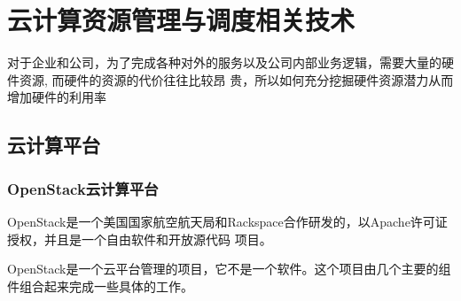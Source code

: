 
\chapter{云计算资源管理与调度相关技术}
\label{chap:outline}

对于企业和公司，为了完成各种对外的服务以及公司内部业务逻辑，需要大量的硬件资源, 而硬件的资源的代价往往比较昂
贵，所以如何充分挖掘硬件资源潜力从而增加硬件的利用率

\section{云计算平台}
\subsection{OpenStack云计算平台}

OpenStack是一个美国国家航空航天局和Rackspace合作研发的，以Apache许可证授权，并且是一个自由软件和开放源代码
项目。

OpenStack是一个云平台管理的项目，它不是一个软件。这个项目由几个主要的组件组合起来完成一些具体的工作。

